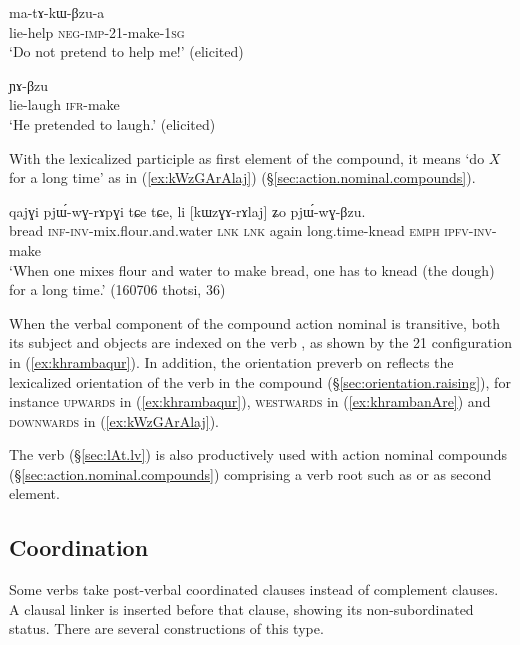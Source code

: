\begin{exe}
	\ex \label{ex:khrambaqur}
	 ma-tɤ-kɯ-βzu-a \\
	lie-help \textsc{neg}-\textsc{imp}-2\fl{}1-make-\textsc{1sg} \\
	\glt `Do not pretend to help me!' (elicited)
\end{exe}

\begin{exe}
	\ex \label{ex:khrambanAre}
	 ɲɤ-βzu \\
	lie-laugh \textsc{ifr}-make \\
	\glt `He pretended to laugh.' (elicited)
\end{exe}

With the lexicalized participle  as first element of the compound, it means `do $X$ for a long time' as in (\ref{ex:kWzGArAlaj}) (§\ref{sec:action.nominal.compounds}). 

\begin{exe}
	\ex \label{ex:kWzGArAlaj}
	\gll qajɣi pjɯ́-wɣ-rɤpɣi tɕe tɕe, li [kɯzɣɤ-rɤlaj] ʑo pjɯ́-wɣ-βzu. \\
	bread \textsc{inf}-\textsc{inv}-mix.flour.and.water \textsc{lnk} \textsc{lnk} again long.time-knead \textsc{emph} \textsc{ipfv}-\textsc{inv}-make \\
	\glt `When one mixes flour and water to make bread, one has to knead (the dough) for a long time.' (160706 thotsi, 36)
\end{exe}

When the verbal component of the compound action nominal is transitive, both its subject and objects are indexed on the verb , as shown by the 2\fl{}1 configuration in (\ref{ex:khrambaqur}). In addition, the orientation preverb on  reflects the lexicalized orientation of the verb in the compound (§\ref{sec:orientation.raising}), for instance \textsc{upwards} in (\ref{ex:khrambaqur}),  \textsc{westwards} in (\ref{ex:khrambanAre}) and \textsc{downwards} in (\ref{ex:kWzGArAlaj}).


The verb  (§\ref{sec:lAt.lv}) is also productively used with action nominal compounds (§\ref{sec:action.nominal.compounds}) comprising a verb root such as  or  as second element.


\subsection{Coordination} \label{sec:coordination.comp.str}
Some verbs take post-verbal coordinated clauses instead of complement clauses. A clausal linker is inserted before that clause, showing its non-subordinated status. There are several constructions of this type.

